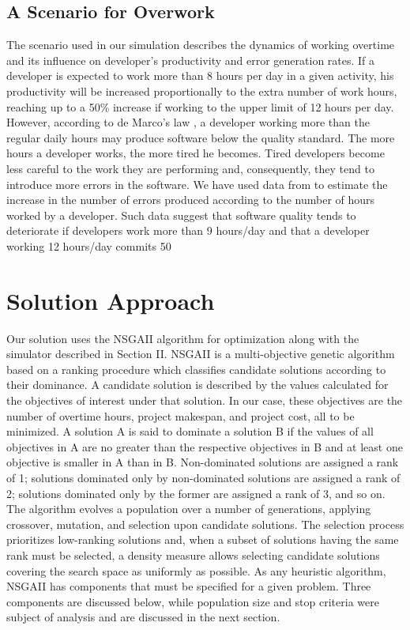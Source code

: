 \documentclass[conference]{IEEEtran}
\begin{document}
\subsection{A Scenario for Overwork}

The scenario used in our simulation describes the dynamics of working overtime and its influence on developer's productivity and error generation rates. If a developer is expected to work more than 8 hours per day in a given activity, his productivity will be increased proportionally to the extra number of work hours, reaching up to a 50\% increase if working to the upper limit of 12 hours per day. However, according to de Marco’s law \cite{demarco:1999}, a developer working more than the regular daily hours may produce software below the quality standard. The more hours a developer works, the more tired he becomes. Tired developers become less careful to the work they are performing and, consequently, they tend to introduce more errors in the software. We have used data from \cite{Abdel-Hamid:1991}  to estimate the increase in the number of errors produced according to the number of hours worked by a developer. Such data suggest that software quality tends to deteriorate if developers work more than 9 hours/day and that a developer working 12 hours/day commits 50%

\section{Solution Approach}
Our solution uses the NSGAII algorithm for optimization along with the simulator described in Section II. NSGAII \cite{deb:2002} is a multi-objective genetic algorithm based on a ranking procedure which classifies candidate solutions according to their dominance. A candidate solution is described by the values calculated for the objectives of interest under that solution. In our case, these objectives are the number of overtime hours, project makespan, and project cost, all to be minimized. A solution A is said to dominate a solution B if the values of all objectives in A are no greater than the respective objectives in B and at least one objective is smaller in A than in B. Non-dominated solutions are assigned a rank of 1; solutions dominated only by non-dominated solutions are assigned a rank of 2; solutions dominated only by the former are assigned a rank of 3, and so on. The algorithm evolves a population over a number of generations, applying crossover, mutation, and selection upon candidate solutions. The selection process prioritizes low-ranking solutions and, when a subset of solutions having the same rank must be selected, a density measure allows selecting candidate solutions covering the search space as uniformly as possible. 
As any heuristic algorithm, NSGAII has components that must be specified for a given problem. Three components are discussed below, while population size and stop criteria were subject of analysis and are discussed in the next section.
\end{document}
